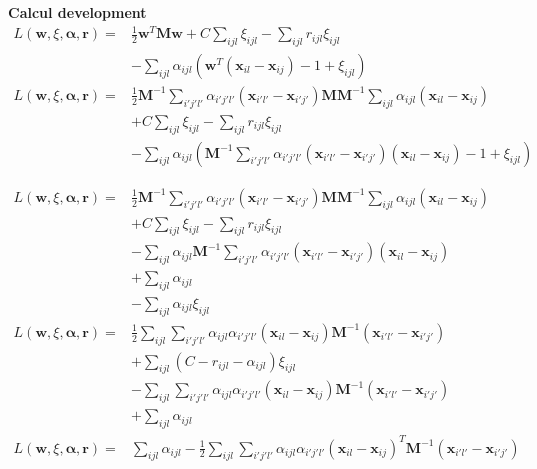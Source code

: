 \noindent \textbf{Calcul development} \\
\begin{align}
L(\textbf{w},\xi,\boldsymbol{\alpha},\textbf{r}) 
= & 
\frac{1}{2} \textbf{w}^T \textbf{M} \textbf{w}
+ C \sum\limits_{ijl} \xi_{ijl} - \sum\limits_{ijl}r_{ijl} \xi_{ijl} \\
&  - \sum\limits_{ijl} \alpha_{ijl}\left( \textbf{w}^T(\textbf{x}_{il}-\textbf{x}_{ij})-1+\xi_{ijl} \right) \nonumber \\
L(\textbf{w},\xi,\boldsymbol{\alpha},\textbf{r})
= & 
\frac{1}{2} \textbf{M}^{-1}  
\sum\limits_{i'j'l'} \alpha_{i'j'l'}(\textbf{x}_{i'l'}-\textbf{x}_{i'j'}) \textbf{M} 
\textbf{M}^{-1}  
\sum\limits_{ijl} \alpha_{ijl}(\textbf{x}_{il}-\textbf{x}_{ij}) \\
& + C \sum\limits_{ijl} \xi_{ijl} - \sum\limits_{ijl}r_{ijl} \xi_{ijl} \nonumber \\
&  - \sum\limits_{ijl} \alpha_{ijl}\left( \textbf{M}^{-1}  
\sum\limits_{i'j'l'} \alpha_{i'j'l'}(\textbf{x}_{i'l'}-\textbf{x}_{i'j'})
(\textbf{x}_{il}-\textbf{x}_{ij})-1+\xi_{ijl} \right) \nonumber
\end{align}

\begin{align}
L(\textbf{w},\xi,\boldsymbol{\alpha},\textbf{r}) 
= & 
\frac{1}{2} \textbf{M}^{-1}  
\sum\limits_{i'j'l'} \alpha_{i'j'l'}(\textbf{x}_{i'l'}-\textbf{x}_{i'j'}) \textbf{M} 
\textbf{M}^{-1}  
\sum\limits_{ijl} \alpha_{ijl}(\textbf{x}_{il}-\textbf{x}_{ij}) \\
& + C \sum\limits_{ijl} \xi_{ijl} - \sum\limits_{ijl}r_{ijl} \xi_{ijl} \nonumber \\
&  - \sum\limits_{ijl} \alpha_{ijl} \textbf{M}^{-1}  
\sum\limits_{i'j'l'} \alpha_{i'j'l'}(\textbf{x}_{i'l'}-\textbf{x}_{i'j'})
(\textbf{x}_{il}-\textbf{x}_{ij}) \nonumber \\
& + \sum\limits_{ijl} \alpha_{ijl} \nonumber \\
& - \sum\limits_{ijl} \alpha_{ijl} \xi_{ijl} \nonumber \\
L(\textbf{w},\xi,\boldsymbol{\alpha},\textbf{r}) 
= & 
\frac{1}{2}
\sum\limits_{ijl} \sum\limits_{i'j'l'} \alpha_{ijl}\alpha_{i'j'l'}(\textbf{x}_{il}-\textbf{x}_{ij})\textbf{M}^{-1}  (\textbf{x}_{i'l'}-\textbf{x}_{i'j'}) \\
& + \sum\limits_{ijl} (C-r_{ijl}-\alpha_{ijl})  \xi_{ijl} \nonumber \\
& -
\sum\limits_{ijl} \sum\limits_{i'j'l'} \alpha_{ijl}\alpha_{i'j'l'}(\textbf{x}_{il}-\textbf{x}_{ij})\textbf{M}^{-1}  (\textbf{x}_{i'l'}-\textbf{x}_{i'j'}) \nonumber\\
& + \sum\limits_{ijl} \alpha_{ijl}  \nonumber \\
L(\textbf{w},\xi,\boldsymbol{\alpha},\textbf{r}) 
= & 
\sum\limits_{ijl} \alpha_{ijl} 
- \frac{1}{2} \sum\limits_{ijl} \sum\limits_{i'j'l'}
\alpha_{ijl} \alpha_{i'j'l'}
(\textbf{x}_{il}-\textbf{x}_{ij})^T
\textbf{M}^{-1}
(\textbf{x}_{i'l'}-\textbf{x}_{i'j'})
\end{align}

